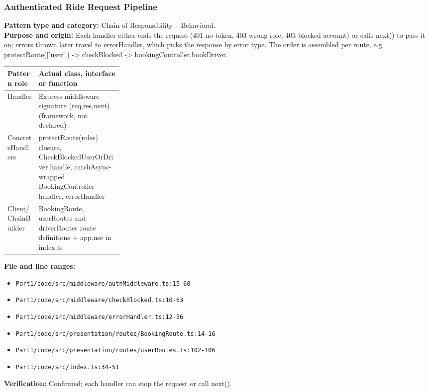 \documentclass[11pt,a4paper]{article}
\begin{document}
\subsubsection*{Authenticated Ride Request Pipeline}
\textbf{Pattern type and category:} Chain of Responsibility -- Behavioral.\\
\textbf{Purpose and origin:} Each handler either ends the request (401 no token, 403 wrong role, 403 blocked account) or calls next() to pass it on; errors thrown later travel to errorHandler, which picks the response by error type. The order is assembled per route, e.g. protectRoute(['user']) -\textgreater{} checkBlocked -\textgreater{} bookingController.bookDriver.

\noindent\begin{tabularx}{\linewidth}{@{}P{0.27\linewidth}Y@{}}
\toprule Pattern role & Actual class, interface or function \\ \midrule
Handler & Express middleware signature (req,res,next) (framework, not declared) \\
ConcreteHandlers & protectRoute(roles) closure, CheckBlockedUserOrDriver.handle, catchAsync-wrapped BookingController handler, errorHandler \\
Client/ChainBuilder & BookingRoute, userRoutes and driverRoutes route definitions + app.use in index.ts \\
\bottomrule
\end{tabularx}

\noindent\textbf{File and line ranges:}\begin{itemize}\setlength\itemsep{0pt}\item \texttt{Part1/\allowbreak{}code/\allowbreak{}src/\allowbreak{}middleware/\allowbreak{}authMiddleware.\allowbreak{}ts:15-60}\item \texttt{Part1/\allowbreak{}code/\allowbreak{}src/\allowbreak{}middleware/\allowbreak{}checkBlocked.\allowbreak{}ts:10-63}\item \texttt{Part1/\allowbreak{}code/\allowbreak{}src/\allowbreak{}middleware/\allowbreak{}errorHandler.\allowbreak{}ts:12-56}\item \texttt{Part1/\allowbreak{}code/\allowbreak{}src/\allowbreak{}presentation/\allowbreak{}routes/\allowbreak{}BookingRoute.\allowbreak{}ts:14-16}\item \texttt{Part1/\allowbreak{}code/\allowbreak{}src/\allowbreak{}presentation/\allowbreak{}routes/\allowbreak{}userRoutes.\allowbreak{}ts:102-106}\item \texttt{Part1/\allowbreak{}code/\allowbreak{}src/\allowbreak{}index.\allowbreak{}ts:34-51}\end{itemize}
\noindent\textbf{Verification:} Confirmed; each handler can stop the request or call next().
\end{document}
